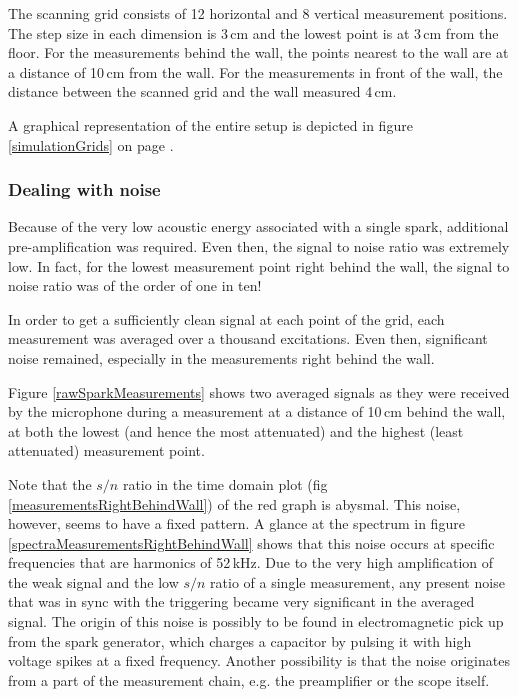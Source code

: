 The scanning grid consists of 12 horizontal and 8 vertical measurement positions. The step size in each dimension is 3\,cm and the lowest point is at 3\,cm from the floor. For the measurements behind the wall, the points nearest to the wall are at a distance of 10\,cm from the wall. For the measurements in front of the wall, the distance between the scanned grid and the wall measured 4\,cm.

A graphical representation of the entire setup is depicted in figure \ref{simulationGrids} on page \pageref{simulationGrids}.

\subsubsection*{Dealing with noise}
Because of the very low acoustic energy associated with a single spark, additional pre-amplification was required. Even then, the signal to noise ratio was extremely low. In fact, for the lowest measurement point right behind the wall, the signal to noise ratio was of the order of one in ten!

In order to get a sufficiently clean signal at each point of the grid, each measurement was averaged over a thousand excitations. Even then, significant noise remained, especially in the measurements right behind the wall.

Figure \ref{rawSparkMeasurements} shows two averaged signals as they were received by the microphone during a measurement at a distance of 10\,cm behind the wall, at both the lowest (and hence the most attenuated) and the highest (least attenuated) measurement point.

Note that the $s/n$ ratio in the time domain plot (fig \ref{measurementsRightBehindWall}) of the red graph is abysmal. This noise, however, seems to have a fixed pattern. A glance at the spectrum in figure \ref{spectraMeasurementsRightBehindWall} shows that this noise occurs at specific frequencies that are harmonics of 52\,kHz. Due to the very high amplification of the weak signal and the low $s/n$ ratio of a single measurement, any present noise that was in sync with the triggering became very significant in the averaged signal. The origin of this noise is possibly to be found in electromagnetic pick up from the spark generator, which charges a capacitor by pulsing it with high voltage spikes at a fixed frequency. Another possibility is that the noise originates from a part of the measurement chain, e.g. the preamplifier or the scope itself.


